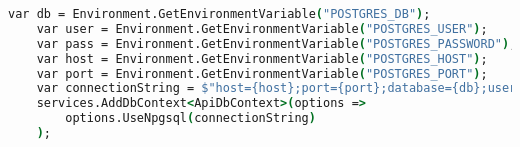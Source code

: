 \begin{lstlisting}[language=csh,caption={ASP.NET Core database connection},breaklines=true,label={lst:aspnetDbConnection}]
    var db = Environment.GetEnvironmentVariable("POSTGRES_DB");
    var user = Environment.GetEnvironmentVariable("POSTGRES_USER");
    var pass = Environment.GetEnvironmentVariable("POSTGRES_PASSWORD");
    var host = Environment.GetEnvironmentVariable("POSTGRES_HOST");
    var port = Environment.GetEnvironmentVariable("POSTGRES_PORT");
    var connectionString = $"host={host};port={port};database={db};username={user};password={pass};";
    services.AddDbContext<ApiDbContext>(options =>
        options.UseNpgsql(connectionString)
    );
\end{lstlisting}
